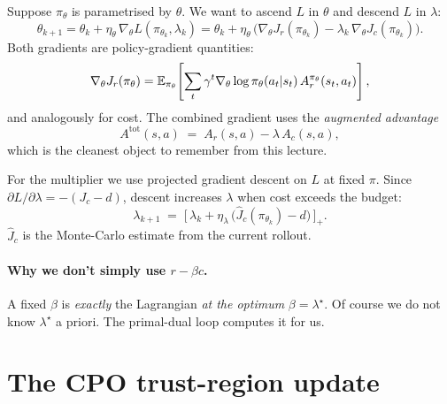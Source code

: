 \documentclass[11pt,oneside]{scrbook}
\begin{document}
Suppose $\pi_\theta$ is parametrised by $\theta$. We want to ascend $L$ in
$\theta$ and descend $L$ in $\lambda$:
\[
   \theta_{k+1} = \theta_k + \eta_\theta\, \nabla_\theta L(\pi_{\theta_k}, \lambda_k)
   = \theta_k + \eta_\theta\, \bigl( \nabla_\theta J_r(\pi_{\theta_k}) - \lambda_k\, \nabla_\theta J_c(\pi_{\theta_k}) \bigr).
\]
Both gradients are policy-gradient quantities:
\[
   \nabla_\theta J_r(\pi_\theta) = \mathbb{E}_{\pi_\theta}\!\left[ \sum_t \gamma^t \nabla_\theta \log \pi_\theta(a_t|s_t)\, A^{\pi_\theta}_r(s_t, a_t) \right],
\]
and analogously for cost. The combined gradient uses the
\emph{augmented advantage}
\begin{equation}\label{eq:aug-adv}
   A^{\text{tot}}(s,a) \;=\; A_r(s,a) - \lambda\, A_c(s,a),
\end{equation}
which is the cleanest object to remember from this lecture.

For the multiplier we use projected gradient descent on $L$ at fixed $\pi$. Since $\partial L/\partial\lambda=-(J_c-d)$, descent increases $\lambda$ when cost exceeds the budget:
\begin{equation}\label{eq:dual-update}
  \lambda_{k+1} \;=\; \bigl[\, \lambda_k + \eta_\lambda\, \bigl( \hat{J}_c(\pi_{\theta_k}) - d \bigr) \,\bigr]_+ .
\end{equation}
$\hat{J}_c$ is the Monte-Carlo estimate from the current rollout.

\paragraph{Why we don't simply use $r - \beta c$.}
A fixed $\beta$ is \emph{exactly} the Lagrangian \emph{at the optimum} $\beta
= \lambda^\star$. Of course we do not know $\lambda^\star$ a priori. The
primal-dual loop computes it for us.

\section{The CPO trust-region update}
\end{document}

